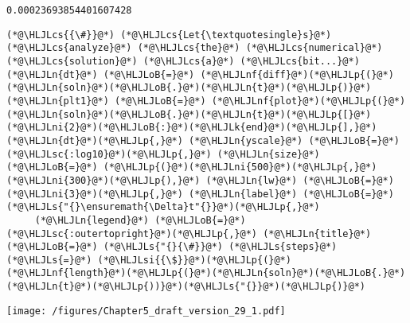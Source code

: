 \documentclass[12pt,landscape]{article}
\newcommand{\HLJLk}[1]{\textcolor[RGB]{148,91,176}{\textbf{#1}}}
\newcommand{\HLJLn}[1]{#1}
\newcommand{\HLJLnf}[1]{\textcolor[RGB]{66,102,213}{#1}}
\newcommand{\HLJLs}[1]{\textcolor[RGB]{201,61,57}{#1}}
\newcommand{\HLJLsc}[1]{\textcolor[RGB]{201,61,57}{#1}}
\newcommand{\HLJLsi}[1]{#1}
\newcommand{\HLJLni}[1]{\textcolor[RGB]{59,151,46}{#1}}
\newcommand{\HLJLoB}[1]{\textcolor[RGB]{102,102,102}{\textbf{#1}}}
\newcommand{\HLJLp}[1]{#1}
\newcommand{\HLJLcs}[1]{\textcolor[RGB]{153,153,119}{\textit{#1}}}
\begin{document}
{\begin{lstlisting}
0.00023693854401607428
\end{lstlisting}


\begin{lstlisting}
(*@\HLJLcs{{\#}}@*) (*@\HLJLcs{Let{\textquotesingle}s}@*) (*@\HLJLcs{analyze}@*) (*@\HLJLcs{the}@*) (*@\HLJLcs{numerical}@*) (*@\HLJLcs{solution}@*) (*@\HLJLcs{a}@*) (*@\HLJLcs{bit...}@*)
(*@\HLJLn{dt}@*) (*@\HLJLoB{=}@*) (*@\HLJLnf{diff}@*)(*@\HLJLp{(}@*)(*@\HLJLn{soln}@*)(*@\HLJLoB{.}@*)(*@\HLJLn{t}@*)(*@\HLJLp{)}@*)
(*@\HLJLn{plt1}@*) (*@\HLJLoB{=}@*) (*@\HLJLnf{plot}@*)(*@\HLJLp{(}@*)(*@\HLJLn{soln}@*)(*@\HLJLoB{.}@*)(*@\HLJLn{t}@*)(*@\HLJLp{[}@*)(*@\HLJLni{2}@*)(*@\HLJLoB{:}@*)(*@\HLJLk{end}@*)(*@\HLJLp{],}@*) (*@\HLJLn{dt}@*)(*@\HLJLp{,}@*) (*@\HLJLn{yscale}@*) (*@\HLJLoB{=}@*) (*@\HLJLsc{:log10}@*)(*@\HLJLp{,}@*) (*@\HLJLn{size}@*) (*@\HLJLoB{=}@*) (*@\HLJLp{(}@*)(*@\HLJLni{500}@*)(*@\HLJLp{,}@*) (*@\HLJLni{300}@*)(*@\HLJLp{),}@*) (*@\HLJLn{lw}@*) (*@\HLJLoB{=}@*) (*@\HLJLni{3}@*)(*@\HLJLp{,}@*) (*@\HLJLn{label}@*) (*@\HLJLoB{=}@*) (*@\HLJLs{"{}\ensuremath{\Delta}t"{}}@*)(*@\HLJLp{,}@*) 
     (*@\HLJLn{legend}@*) (*@\HLJLoB{=}@*) (*@\HLJLsc{:outertopright}@*)(*@\HLJLp{,}@*) (*@\HLJLn{title}@*) (*@\HLJLoB{=}@*) (*@\HLJLs{"{}{\#}}@*) (*@\HLJLs{steps}@*) (*@\HLJLs{=}@*) (*@\HLJLsi{{\$}}@*)(*@\HLJLp{(}@*)(*@\HLJLnf{length}@*)(*@\HLJLp{(}@*)(*@\HLJLn{soln}@*)(*@\HLJLoB{.}@*)(*@\HLJLn{t}@*)(*@\HLJLp{))}@*)(*@\HLJLs{"{}}@*)(*@\HLJLp{)}@*)
\end{lstlisting}

\texttt{[image: /figures/Chapter5\_draft\_version\_29\_1.pdf]}

}
\end{document}
